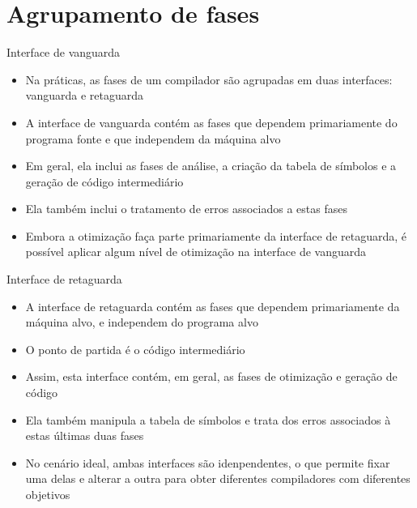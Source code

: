 \section{Agrupamento de fases}

\begin{frame}[fragile]{Interface de vanguarda}

    \begin{itemize}
        \item Na práticas, as fases de um compilador são agrupadas em duas interfaces: vanguarda e retaguarda
        \pause

        \item A interface de vanguarda contém as fases que dependem primariamente do programa fonte e que independem da máquina alvo
        \pause

        \item Em geral, ela inclui as fases de análise, a criação da tabela de símbolos e a geração de código intermediário
        \pause

        \item Ela também inclui o tratamento de erros associados a estas fases
        \pause

        \item Embora a otimização faça parte primariamente da interface de retaguarda, é possível aplicar algum nível de otimização na interface de
        vanguarda
    \end{itemize}

\end{frame}

\begin{frame}[fragile]{Interface de retaguarda}

    \begin{itemize}
        \item A interface de retaguarda contém as fases que dependem primariamente da máquina alvo, e independem do programa alvo
        \pause

        \item O ponto de partida é o código intermediário
        \pause

        \item Assim, esta interface contém, em geral, as fases de otimização e geração de código
        \pause

        \item Ela também manipula a tabela de símbolos e trata dos erros associados à estas últimas duas fases
        \pause

        \item No cenário ideal, ambas interfaces são idenpendentes, o que permite fixar uma delas e alterar a outra para obter diferentes compiladores com
        diferentes objetivos
    \end{itemize}

\end{frame}

